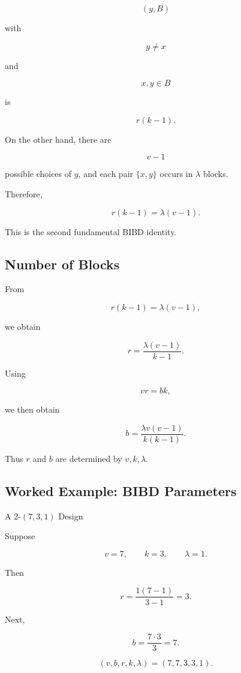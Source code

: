 \[
(y,B)
\]

with

\[
y\neq x
\]

and

\[
x,y\in B
\]

is

\[
r(k-1).
\]

On the other hand, there are

\[
v-1
\]

possible choices of \(y\), and each pair \(\{x,y\}\) occurs in
\(\lambda\) blocks.

Therefore,

\[
\boxed{
r(k-1)
=
\lambda(v-1).
}
\]

This is the second fundamental BIBD identity.

\subsection{Number of Blocks}
\label{subsec:bibd-number-blocks}

From

\[
r(k-1)=\lambda(v-1),
\]

we obtain

\[
\boxed{
r
=
\frac{\lambda(v-1)}{k-1}.
}
\]

Using

\[
vr=bk,
\]

we then obtain

\[
\boxed{
b
=
\frac{\lambda v(v-1)}
{k(k-1)}.
}
\]

Thus \(r\) and \(b\) are determined by \(v,k,\lambda\).

\subsection{Worked Example: BIBD Parameters}
\label{subsec:worked-bibd-parameters}

\begin{workedexamplebox}{A \(2\)-\((7,3,1)\) Design}

Suppose

\[
v=7,
\qquad
k=3,
\qquad
\lambda=1.
\]

Then

\[
r
=
\frac{1(7-1)}{3-1}
=
3.
\]

Next,

\[
b
=
\frac{7\cdot3}{3}
=
7.
\]

\begin{answerbox}
\[
\boxed{
(v,b,r,k,\lambda)
=
(7,7,3,3,1).
}
\]
\end{answerbox}

\end{workedexamplebox}

